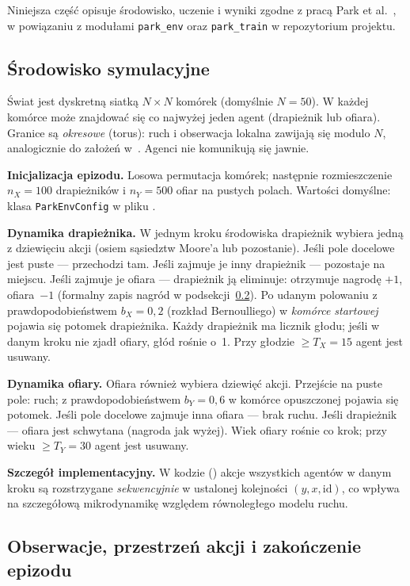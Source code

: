 \documentclass[polish]{template/projectreport}
\begin{document}
Niniejsza część opisuje środowisko, uczenie i wyniki zgodne z pracą Park et al.~\cite{park2021}, w powiązaniu z modułami \texttt{park\_env} oraz \texttt{park\_train} w repozytorium projektu.

\subsection{Środowisko symulacyjne}
\label{sec:srodowisko}

Świat jest dyskretną siatką \(N \times N\) komórek (domyślnie \(N=50\)). W każdej komórce może znajdować się co najwyżej jeden agent (drapieżnik lub ofiara). Granice są \emph{okresowe} (torus): ruch i obserwacja lokalna zawijają się modulo \(N\), analogicznie do założeń w~\cite{park2021}. Agenci nie komunikują się jawnie.

\textbf{Inicjalizacja epizodu.} Losowa permutacja komórek; następnie rozmieszczenie \(n_X=100\) drapieżników i \(n_Y=500\) ofiar na pustych polach. Wartości domyślne: klasa \texttt{ParkEnvConfig} w pliku .

\textbf{Dynamika drapieżnika.} W jednym kroku środowiska drapieżnik wybiera jedną z dziewięciu akcji (osiem sąsiedztw Moore'a lub pozostanie). Jeśli pole docelowe jest puste --- przechodzi tam. Jeśli zajmuje je inny drapieżnik --- pozostaje na miejscu. Jeśli zajmuje je ofiara --- drapieżnik ją eliminuje: otrzymuje nagrodę \(+1\), ofiara~\(-1\) (formalny zapis nagród w podsekcji~\ref{sec:obserwacje}). Po udanym polowaniu z prawdopodobieństwem \(b_X=0{,}2\) (rozkład Bernoulliego) w \emph{komórce startowej} pojawia się potomek drapieżnika. Każdy drapieżnik ma licznik głodu; jeśli w danym kroku nie zjadł ofiary, głód rośnie o~1. Przy głodzie \(\geq T_X=15\) agent jest usuwany.

\textbf{Dynamika ofiary.} Ofiara również wybiera dziewięć akcji. Przejście na puste pole: ruch; z prawdopodobieństwem \(b_Y=0{,}6\) w komórce opuszczonej pojawia się potomek. Jeśli pole docelowe zajmuje inna ofiara --- brak ruchu. Jeśli drapieżnik --- ofiara jest schwytana (nagroda jak wyżej). Wiek ofiary rośnie co krok; przy wieku \(\geq T_Y=30\) agent jest usuwany.

\textbf{Szczegół implementacyjny.} W kodzie () akcje wszystkich agentów w danym kroku są rozstrzygane \emph{sekwencyjnie} w ustalonej kolejności \((y, x, \text{id})\), co wpływa na szczegółową mikrodynamikę względem równoległego modelu ruchu.

\subsection{Obserwacje, przestrzeń akcji i zakończenie epizodu}
\label{sec:obserwacje}
\end{document}
